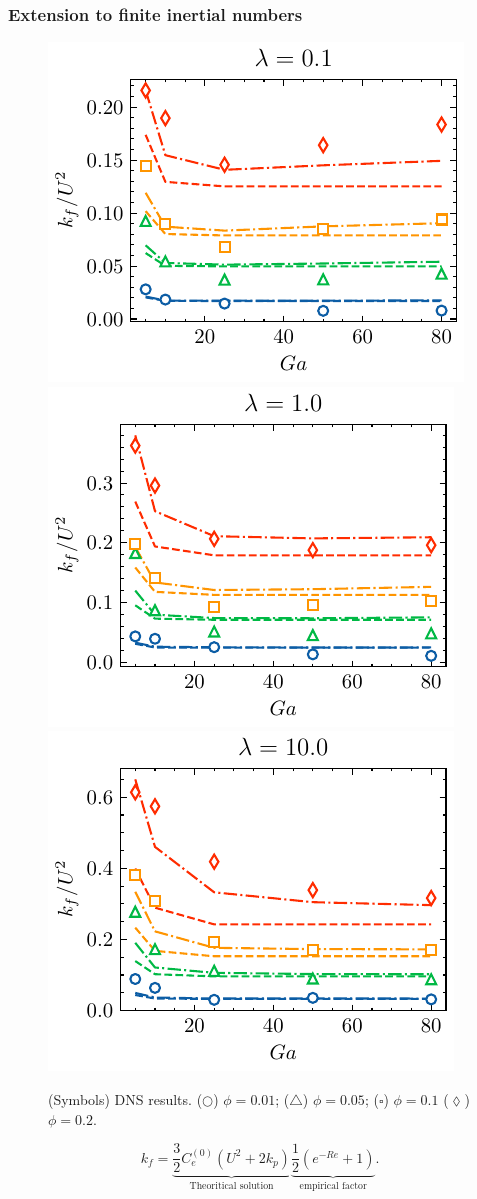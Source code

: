 \documentclass{sintefbeamer}
\begin{document}
\begin{frame}
  \frametitle{Extension to finite inertial numbers}
  \begin{figure}
    \centering
    \includegraphics[height = 0.25\textwidth]{image/HOMOGENEOUS_final/CA/KF2_l_0.pdf}
    \includegraphics[height = 0.25\textwidth]{image/HOMOGENEOUS_final/CA/KF2_l_1.pdf}
    \includegraphics[height = 0.25\textwidth]{image/HOMOGENEOUS_final/CA/KF2_l_10.pdf}
    \caption{\footnotesize
    (Symbols) DNS results. 
    ($\pmb\bigcirc$) $\phi = 0.01$; ($\pmb\triangle$) $ \phi = 0.05$; ($\pmb\square$) $\phi = 0.1$ ($\pmb\lozenge$) $\phi = 0.2$.
    }
    \label{fig:kf}
\end{figure}
\begin{equation}
  k_f
  = 
  \underbrace{\frac{3}{2} C_e^{(0)}  \left( U^2 + 2 k_p\right)  }_\text{Theoritical solution}
  \underbrace{\frac{1}{2}\left(e^{-Re} +1\right)}_{\text{empirical factor}}.
  \label{eq:semi_empirical}
\end{equation}

\end{frame}
\end{document}
